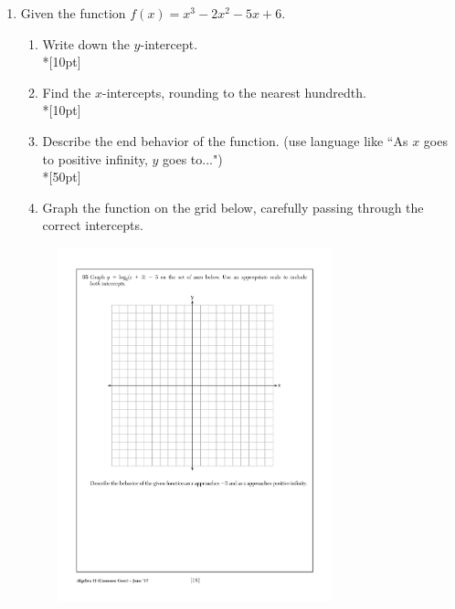 \documentclass[12pt, oneside]{article}
\begin{document}

\vspace{1cm}

\begin{enumerate}

\item Given the function $f(x)=x^3-2x^2-5x+6$. 
\begin{enumerate}
    \item Write down the $y$-intercept.\\*[10pt]
    \item Find the $x$-intercepts, rounding to the nearest hundredth.\\*[10pt]
    \item Describe the end behavior of the function. (use language like ``As $x$ goes to positive infinity, $y$ goes to...")\\*[50pt]
    \item Graph the function on the grid below, carefully passing through the correct intercepts. 
\end{enumerate}

\begin{figure}[!ht]
    \centering
    \includegraphics[width=0.75\textwidth]{regents-grid.pdf}
\end{figure}


\end{enumerate}
\end{document}
